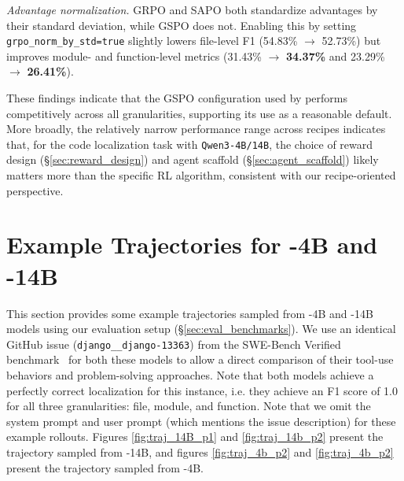 \emph{Advantage normalization.} GRPO and SAPO both standardize advantages by their standard deviation, while GSPO does not. Enabling this by setting \texttt{grpo\_norm\_by\_std=true} slightly lowers file-level F1 (54.83\% $\to$ 52.73\%) but improves module- and function-level metrics (31.43\% $\to$ \textbf{34.37\%} and 23.29\% $\to$ \textbf{26.41\%}).

These findings indicate that the GSPO configuration used by \methodname performs competitively across all granularities, supporting its use as a reasonable default. More broadly, the relatively narrow performance range across recipes indicates that, for the code localization task with \texttt{Qwen3-4B/14B}, the choice of reward design (\S\ref{sec:reward_design}) and agent scaffold (\S\ref{sec:agent_scaffold}) likely matters more than the specific RL algorithm, consistent with our recipe-oriented perspective.
  



\section{Example Trajectories for \methodname-4B and \methodname-14B}\label{appendix:traj_examples}
This section provides some example trajectories sampled from \methodname-4B and \methodname-14B models using our evaluation setup (\S\ref{sec:eval_benchmarks}). We use an identical GitHub issue (\texttt{django\_\_django-13363}) from the SWE-Bench Verified benchmark~\citep{chowdhury2024swebenchverified} for both these models to allow a direct comparison of their tool-use behaviors and problem-solving approaches. Note that both models achieve a perfectly correct localization for this instance, i.e. they achieve an F1 score of 1.0 for all three granularities: file, module, and function. Note that we omit the system prompt and user prompt (which mentions the issue description) for these example rollouts. Figures \ref{fig:traj_14B_p1} and \ref{fig:traj_14b_p2} present the trajectory sampled from \methodname-14B, and figures \ref{fig:traj_4b_p2} and \ref{fig:traj_4b_p2} present the trajectory sampled from \methodname-4B.

